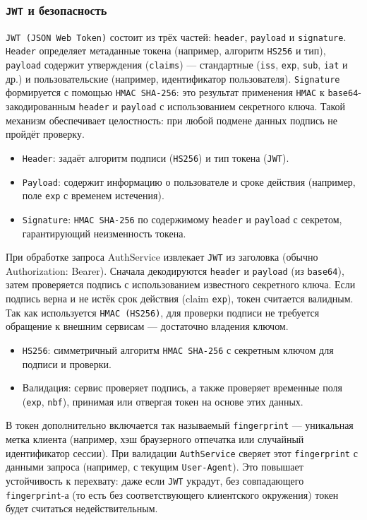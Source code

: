 \subsubsection*{\texttt{JWT} и безопасность}
\texttt{JWT (JSON Web Token)} состоит из трёх частей: \texttt{header}, \texttt{payload} и \texttt{signature}. \texttt{Header} определяет метаданные токена (например, алгоритм \texttt{HS256} и тип), \texttt{payload} содержит утверждения (\texttt{claims}) — стандартные (\texttt{iss}, \texttt{exp}, \texttt{sub}, \texttt{iat} и др.) и пользовательские (например, идентификатор пользователя). \texttt{Signature} формируется с помощью \texttt{HMAC SHA-256}: это результат применения \texttt{HMAC} к \texttt{base64}-закодированным \texttt{header} и \texttt{payload} с использованием секретного ключа. Такой механизм обеспечивает целостность: при любой подмене данных подпись не пройдёт проверку.
\begin{itemize}
    \item \texttt{Header}: задаёт алгоритм подписи (\texttt{HS256}) и тип токена (\texttt{JWT}).
    \item \texttt{Payload}: содержит информацию о пользователе и сроке действия (например, поле \texttt{exp} с временем истечения).
    \item \texttt{Signature}: \texttt{HMAC SHA-256} по содержимому \texttt{header} и \texttt{payload} с секретом, гарантирующий неизменность токена.
\end{itemize}
\noindent При обработке запроса AuthService извлекает \texttt{JWT} из заголовка (обычно \\ Authorization: Bearer). Сначала декодируются \texttt{header} и \texttt{payload} (из \texttt{base64}), затем проверяется подпись с использованием известного секретного ключа. Если подпись верна и не истёк срок действия (claim \texttt{exp}), токен считается валидным. Так как используется \texttt{HMAC (HS256)}, для проверки подписи не требуется обращение к внешним сервисам — достаточно владения ключом.
\begin{itemize}
    \item \texttt{HS256}: симметричный алгоритм \texttt{HMAC SHA-256} с секретным ключом для подписи и проверки.
    \item Валидация: сервис проверяет подпись, а также проверяет временные поля (\texttt{exp}, \texttt{nbf}), принимая или отвергая токен на основе этих данных.
\end{itemize}
\noindent В токен дополнительно включается так называемый \texttt{fingerprint} — уникальная метка клиента (например, хэш браузерного отпечатка или случайный идентификатор сессии). При валидации \texttt{AuthService} сверяет этот \texttt{fingerprint} с данными запроса (например, с текущим \texttt{User-Agent}). Это повышает устойчивость к перехвату: даже если \texttt{JWT} украдут, без совпадающего \texttt{fingerprint}-а (то есть без соответствующего клиентского окружения) токен будет считаться недействительным.
